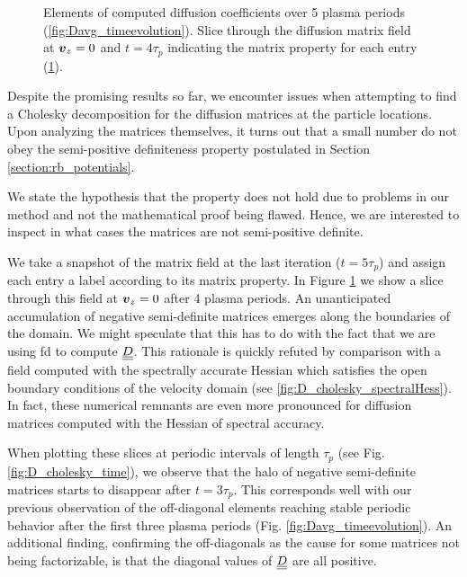 \begin{figure}
\begin{subfigure}[b]{0.42\textwidth}
    \caption{}
    \label{fig:D_cholesky}
  \end{subfigure}
  \caption{Elements of computed diffusion coefficients over 5 plasma periods
  (\ref{fig:Davg_timeevolution}). Slice through the diffusion matrix field at $\boldsymbol{v}_z = 0$ 
and $t = 4 \tau_p$ indicating the matrix property for each entry (\ref{fig:D_cholesky}).}
\label{fig:D_analysis_DIH}
\end{figure}

Despite the promising results so far, we encounter issues when attempting to find a Cholesky
decomposition for the diffusion matrices at the particle locations.
Upon analyzing the matrices themselves, it turns out that a small number do not obey the semi-positive
definiteness property postulated in Section \ref{section:rb_potentials}.


We state the hypothesis that the property does not hold due to problems in our method and not the
mathematical proof being flawed.
Hence, we are interested to inspect in what cases the matrices are not semi-positive definite.

We take a snapshot of the matrix field at the last iteration ($t=5\tau_p$) and assign each entry a label according to
its matrix property.
In Figure \ref{fig:D_cholesky} we show a slice through this field at $\boldsymbol{v}_z = 0$ after 4 plasma
periods.
An unanticipated accumulation of negative semi-definite matrices emerges along the boundaries of the domain.
We might speculate that this has to do with the fact that we are using \gls{fd} to compute
$\underline{\underline{D}}$.
This rationale is quickly refuted by comparison with a field computed with the spectrally
accurate Hessian which satisfies the open boundary conditions of the velocity domain 
(see \ref{fig:D_cholesky_spectralHess}).
In fact, these numerical remnants are even more pronounced for diffusion matrices computed with the 
Hessian of spectral accuracy.

When plotting these slices at periodic intervals of length $\tau_p$ (see Fig. \ref{fig:D_cholesky_time}), we observe that the halo of
negative semi-definite matrices starts to disappear after $t = 3\tau_p$.
This corresponds well with our previous observation of the off-diagonal elements reaching stable periodic behavior
after the first three plasma periods (Fig. \ref{fig:Davg_timeevolution}).
An additional finding, confirming the off-diagonals as the cause for some matrices not being
factorizable, is that the diagonal values of $\underline{\underline{D}}$ are all positive.

